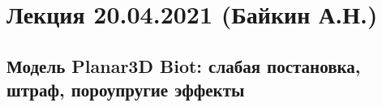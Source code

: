 \documentclass[main.tex]{subfiles}
\begin{document}

\section{Лекция 20.04.2021 (Байкин А.Н.)}

\subsection{Модель Planar3D Biot: слабая постановка, штраф, пороупругие эффекты}
\end{document}
